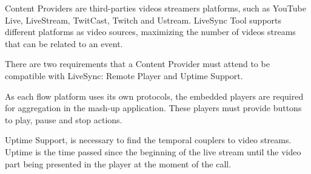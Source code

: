 Content Providers are third-parties videos streamers platforms, such as YouTube Live, LiveStream, TwitCast, Twitch and Ustream. LiveSync Tool supports different platforms as video sources, maximizing the number of videos streams that can be related to an event.

There are two requirements that a Content Provider must attend to be compatible with LiveSync: Remote Player and Uptime Support.

As each flow platform uses its own protocols, the embedded players are required for aggregation in the mash-up application. These players must provide buttons to play, pause and stop actions.

Uptime Support, is necessary to find the temporal couplers to video streams. Uptime is the time passed since the beginning of the live stream until the video part being presented in the player at the moment of the call.
